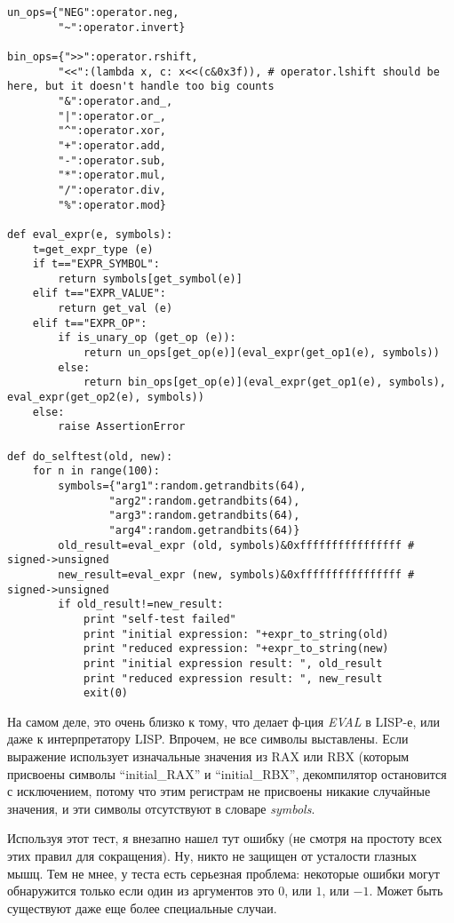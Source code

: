 \begin{lstlisting}
un_ops={"NEG":operator.neg,
        "~":operator.invert}

bin_ops={">>":operator.rshift,
        "<<":(lambda x, c: x<<(c&0x3f)), # operator.lshift should be here, but it doesn't handle too big counts
        "&":operator.and_,
        "|":operator.or_,
        "^":operator.xor,
        "+":operator.add,
        "-":operator.sub,
        "*":operator.mul,
        "/":operator.div,
        "%":operator.mod}

def eval_expr(e, symbols):
    t=get_expr_type (e)
    if t=="EXPR_SYMBOL":
        return symbols[get_symbol(e)]
    elif t=="EXPR_VALUE":
        return get_val (e)
    elif t=="EXPR_OP":
        if is_unary_op (get_op (e)):
            return un_ops[get_op(e)](eval_expr(get_op1(e), symbols))
        else:
            return bin_ops[get_op(e)](eval_expr(get_op1(e), symbols), eval_expr(get_op2(e), symbols))
    else:
        raise AssertionError

def do_selftest(old, new):
    for n in range(100):
        symbols={"arg1":random.getrandbits(64), 
                "arg2":random.getrandbits(64), 
                "arg3":random.getrandbits(64), 
                "arg4":random.getrandbits(64)}
        old_result=eval_expr (old, symbols)&0xffffffffffffffff # signed->unsigned
        new_result=eval_expr (new, symbols)&0xffffffffffffffff # signed->unsigned
        if old_result!=new_result:
            print "self-test failed"
            print "initial expression: "+expr_to_string(old)
            print "reduced expression: "+expr_to_string(new)
            print "initial expression result: ", old_result
            print "reduced expression result: ", new_result
            exit(0)
\end{lstlisting}

На самом деле, это очень близко к тому, что делает ф-ция \textit{EVAL} в LISP-е, или даже к интерпретатору LISP.
Впрочем, не все символы выставлены.
Если выражение использует изначальные значения из RAX или RBX
(которым присвоены символы ``initial\_RAX'' и ``initial\_RBX'',
декомпилятор остановится с исключением, потому что этим регистрам не присвоены никакие случайные значения,
и эти символы отсутствуют в словаре \textit{symbols}.

Используя этот тест, я внезапно нашел тут ошибку (не смотря на простоту всех этих правил для сокращения).
Ну, никто не защищен от усталости глазных мышц.
Тем не мнее, у теста есть серьезная проблема: некоторые ошибки могут обнаружится только если один из аргументов это
$0$, или $1$, или $-1$.
Может быть существуют даже еще более специальные случаи.

